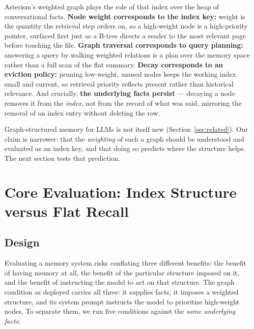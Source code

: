 \documentclass[11pt]{article}
\begin{document}
Asterism's weighted graph plays the role of that index over the heap of conversational facts. \textbf{Node weight corresponds to the index key:} weight is the quantity the retrieval step orders on, so a high-weight node is a high-priority pointer, surfaced first just as a B-tree directs a reader to the most relevant page before touching the file. \textbf{Graph traversal corresponds to query planning:} answering a query by walking weighted relations is a plan over the memory space rather than a full scan of the flat summary. \textbf{Decay corresponds to an eviction policy:} pruning low-weight, unused nodes keeps the working index small and current, so retrieval priority reflects present rather than historical relevance. And crucially, \textbf{the underlying facts persist} --- decaying a node removes it from the \emph{index}, not from the record of what was said, mirroring the removal of an index entry without deleting the row.

Graph-structured memory for LLMs is not itself new (Section~\ref{sec:related}). Our claim is narrower: that the \emph{weighting} of such a graph should be understood and evaluated as an index key, and that doing so predicts where the structure helps. The next section tests that prediction.

\section{Core Evaluation: Index Structure versus Flat Recall}
\label{sec:poc}

\subsection{Design}

Evaluating a memory system risks conflating three different benefits: the benefit of having memory at all, the benefit of the particular structure imposed on it, and the benefit of instructing the model to act on that structure. The graph condition as deployed carries all three: it supplies facts, it imposes a weighted structure, and its system prompt instructs the model to prioritize high-weight nodes. To separate them, we run five conditions against the \emph{same underlying facts}:
\end{document}

